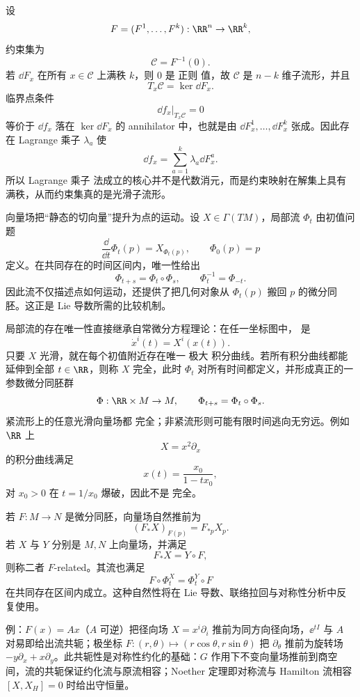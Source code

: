 \begin{exbox}
设
\[
F=(F^1,\ldots,F^k):\RR^n\to\RR^k,
\]
约束集为
\[
\mathcal C=F^{-1}(0).
\]
若 $\dd F_x$ 在所有 $x\in\mathcal C$ 上满秩 $k$，则 $0$ 是 正则 值，故 $\mathcal C$ 是 $n-k$ 维子流形，并且
\[
T_x\mathcal C=\ker\dd F_x.
\]
临界点条件
\[
\dd f_x|_{T_x\mathcal C}=0
\]
等价于 $\dd f_x$ 落在 $\ker\dd F_x$ 的 annihilator 中，也就是由 $\dd F^1_x,\ldots,\dd F^k_x$ 张成。因此存在 Lagrange 乘子 $\lambda_a$ 使
\[
\dd f_x=\sum_{a=1}^k\lambda_a\dd F^a_x.
\]
所以 Lagrange 乘子 法成立的核心并不是代数消元，而是约束映射在解集上具有满秩，从而约束集真的是光滑子流形。
\end{exbox}
向量场把“静态的切向量”提升为点的运动。设 $X\in\Gamma(TM)$，局部流 $\Phi_t$ 由初值问题
\begin{equation}\label{eq:math-dg-flow-ode}
\frac{\dd}{\dd t}\Phi_t(p)=X_{\Phi_t(p)},
\qquad
\Phi_0(p)=p
\end{equation}
定义。在共同存在的时间区间内，唯一性给出
\[
\Phi_{t+s}=\Phi_t\circ\Phi_s,
\qquad
\Phi_t^{-1}=\Phi_{-t}.
\]
因此流不仅描述点如何运动，还提供了把几何对象从 $\Phi_t(p)$ 搬回 $p$ 的微分同胚。这正是 Lie 导数所需的比较机制。

局部流的存在唯一性直接继承自常微分方程理论：在任一坐标图中， 是
\[
\dot x^i(t)=X^i(x(t)).
\]
只要 $X$ 光滑，就在每个初值附近存在唯一 极大 积分曲线。若所有积分曲线都能延伸到全部 $t\in\RR$，则称 $X$ 完全，此时 $\Phi_t$ 对所有时间都定义，并形成真正的一参数微分同胚群
\[
\Phi:\RR\times M\to M,
\qquad
\Phi_{t+s}=\Phi_t\circ\Phi_s.
\]
紧流形上的任意光滑向量场都 完全；非紧流形则可能有限时间逃向无穷远。例如 $\RR$ 上
\[
X=x^2\partial_x
\]
的积分曲线满足
\[
x(t)=\frac{x_0}{1-tx_0},
\]
对 $x_0>0$ 在 $t=1/x_0$ 爆破，因此不是 完全。

若 $F:M\to N$ 是微分同胚，向量场自然推前为
\[
(F_*X)_{F(p)}=F_{*p}X_p.
\]
若 $X$ 与 $Y$ 分别是 $M,N$ 上向量场，并满足
\[
F_*X=Y\circ F,
\]
则称二者 $F$-related。其流也满足
\begin{equation}
F\circ\Phi_t^X=\Phi_t^Y\circ F
\label{eq:related-flow-naturality}
\end{equation}
在共同存在区间内成立。这种自然性将在 Lie 导数、联络拉回与对称性分析中反复使用。

例：$F(x)=Ax$（$A$ 可逆）把径向场 $X=x^i\partial_i$ 推前为同方向径向场，$\ee^{tI}$ 与 $A$ 对易即给出流共轭；极坐标 $F:(r,\theta)\mapsto(r\cos\theta,r\sin\theta)$ 把 $\partial_\theta$ 推前为旋转场 $-y\partial_x+x\partial_y$。此共轭性是对称性约化的基础：$G$ 作用下不变向量场推前到商空间，流的共轭保证约化流与原流相容；Noether 定理即对称流与 Hamilton 流相容 $[X,X_H]=0$ 时给出守恒量。

